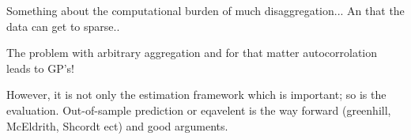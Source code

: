 \documentclass[a4paper]{article}
\begin{document}
Something about the computational burden of much disaggregation... An that the data can get to sparse..

The problem with arbitrary aggregation and for that matter autocorrolation leads to GP's!


However, it is not only the estimation framework which is important; so is the evaluation. Out-of-sample prediction or eqavelent is the way forward (greenhill, McEldrith, Shcordt ect) and good arguments.








\end{document}
